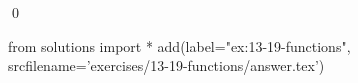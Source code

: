 
\begin{ex}
  \label{ex:13-19-functions}
  
  \qed
\end{ex}
\begin{python0}
from solutions import *
add(label="ex:13-19-functions",
    srcfilename='exercises/13-19-functions/answer.tex')
\end{python0}
